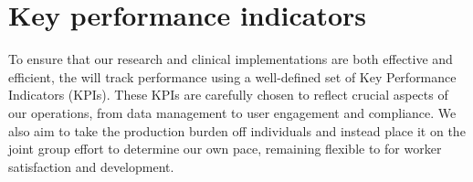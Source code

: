 %
%
%
%

\section{Key performance indicators}

To ensure that our research and clinical implementations are both effective and efficient, the \pmu will track performance using a well-defined set of Key Performance Indicators (KPIs). 
These KPIs are carefully chosen to reflect crucial aspects of our operations, from data management to user engagement and compliance.
We also aim to take the production burden off individuals and instead place it on the joint group effort to determine our own pace, remaining flexible to for worker satisfaction and development.

